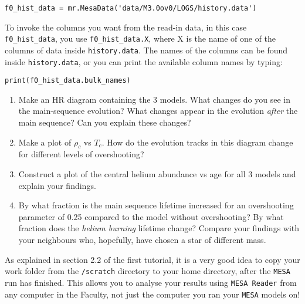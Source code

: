 \documentclass[11pt,a4paper]{article}
\begin{document}
\begin{enumerate}
\begin{lstlisting}[style=pythonstyle]
f0_hist_data = mr.MesaData('data/M3.0ov0/LOGS/history.data')
\end{lstlisting}


To invoke the columns you want from the read-in data, in this case \texttt{f0\_hist\_data}, you use \texttt{f0\_hist\_data.X}, where X is the name of one of the columns of data inside \texttt{history.data}. The names of the columns can be found inside \texttt{history.data}, or you can print the available column names by typing: 

\begin{lstlisting}[style=pythonstyle]
print(f0_hist_data.bulk_names)
\end{lstlisting}

\begin{enumerate}

  \item Make an HR diagram containing the 3 models. What changes do you see in the main-sequence evolution? What changes appear in the evolution \emph{after} the main sequence? Can you explain these changes?

  \item Make a plot of $\rho_c$ vs $T_c$. How do the evolution tracks in this diagram change for different levels of overshooting?

  \item Construct a plot of the central helium abundance vs age for all 3 models and explain your findings. 

  \item By what fraction is the main sequence lifetime increased for an overshooting parameter of 0.25 compared to the model without overshooting? By what fraction does the \emph{helium burning} lifetime change? Compare your findings with your neighbours who, hopefully, have chosen a star of different mass.

\end{enumerate}

\end{enumerate}


\begin{tcolorbox}[protipbox]
As explained in section 2.2 of the first tutorial, it is a very good idea to copy your work folder from the \verb|/scratch| directory to your home directory, after the \texttt{MESA} run has finished. This allows you to analyse your results using \texttt{MESA Reader} from any computer in the Faculty, not just the computer you ran your \texttt{MESA} models on! 
\end{tcolorbox}
\end{document}
